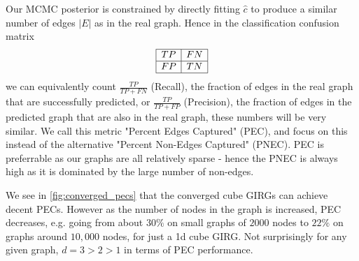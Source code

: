 Our MCMC posterior is constrained by directly fitting $\hat{c}$ to produce a similar number of edges $|E|$ as in the real graph. Hence in the classification confusion matrix
\begin{equation}
  \begin{array}{|c|c|}
    \hline
    TP & FN \\
    \hline
    FP & TN \\
    \hline
    \end{array}
\end{equation}
we can equivalently count $\frac{TP}{TP + FN}$ (Recall), the fraction of edges in the real graph that are successfully predicted, or $\frac{TP}{TP + FP}$ (Precision), the fraction of edges in the predicted graph that are also in the real graph, these numbers will be very similar. We call this metric "Percent Edges Captured" (PEC), and focus on this instead of the alternative "Percent Non-Edges Captured" (PNEC). PEC is preferrable as our graphs are all relatively sparse - hence the PNEC is always high as it is dominated by the large number of non-edges.

We see in \cref{fig:converged_pecs} that the converged cube GIRGs can achieve decent PECs. However as the number of nodes in the graph is increased, PEC decreases, e.g. going from about $30\%$ on small graphs of $2000$ nodes to $22\%$ on graphs around $10,000$ nodes, for just a 1d cube GIRG. Not surprisingly for any given graph, $d=3 > 2 > 1$ in terms of PEC performance.





